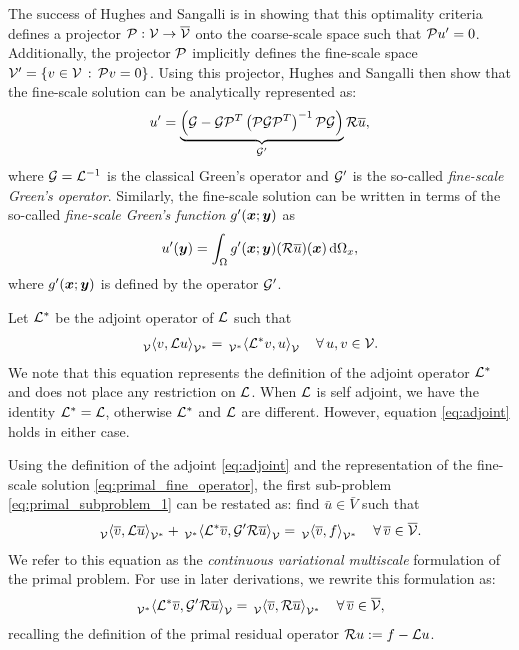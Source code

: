 The success of Hughes and Sangalli
\cite{hughes2007variational} is in showing
that this optimality criteria defines a
projector $\P : \V \to \bar{\V}$ onto the
coarse-scale space such that
$\P u' = 0$. Additionally, the projector $\P$
implicitly defines the fine-scale space
$\V' = \left\{ v \in \V \, : \, \P v = 0 \right\}$.
Using this projector, Hughes and Sangalli
then show that the fine-scale solution can
be analytically represented as:
%
\begin{gather}
u' = \underbrace{
\left(
\G - \G \P^T \left( \P \G \P^T \right) ^{-1} \P \G
\right)
}
_{\G'} \R \bar{u},
\label{eq:primal_fine_operator}
\end{gather}
%
where $\G = \OP^{-1}$ is the classical Green's
operator and $\G'$ is the so-called
\emph{fine-scale Green's operator}. Similarly,
the fine-scale solution can be written
in terms of the so-called
\emph{fine-scale Green's function} $g'(\bs{x};\bs{y})$
as
%
\begin{gather}
u'(\bs{y}) = \int_{\Omega} g'(\bs{x};\bs{y}) (\R \bar{u})(\bs{x})
\, \text{d} \Omega_x,
\label{eq:primal_fine_function}
\end{gather}
%
where $g'(\bs{x};\bs{y})$ is defined by the operator $\G'$.

Let $\OP^*$ be the adjoint operator of $\OP$ such that
%
\begin{gather}
\pairb{v}{\OP u} = \paira{\OP^* v}{u}
\quad \forall \, u, v \in \V.
\label{eq:adjoint}
\end{gather}
%
We note that this equation represents the definition of
the adjoint operator $\OP^*$ and does not place any
restriction on $\OP$. When $\OP$ is self adjoint, we
have the identity $\OP^* = \OP$, otherwise $\OP^*$
and $\OP$ are different. However, equation
\eqref{eq:adjoint} holds in either case.

Using the definition of the adjoint \eqref{eq:adjoint}
and the representation of the
fine-scale solution \eqref{eq:primal_fine_operator},
the first sub-problem \eqref{eq:primal_subproblem_1}
can be restated as:
find $\bar{u} \in \bar{V}$ such that
%
\begin{gather}
\pairb{\bar{v}}{\OP \bar{u}} +
\paira{\OP^* \bar{v}}{\G' \R \bar{u}} =
\pairb{\bar{v}}{f}
\quad \forall \, \bar{v} \in \bar{\V}.
\label{eq:primal_vms}
\end{gather}
%
We refer to this equation as the \emph{continuous
variational multiscale} formulation of the primal
problem. For use in later derivations, we rewrite
this formulation as:
%
\begin{gather}
\paira{\OP^* \bar{v}}{\G' \R \bar{u}} = \pairb{\bar{v}}{\R \bar{u}}
\quad \forall \, \bar{v} \in \bar{\V},
\label{eq:primal_vms_2}
\end{gather}
%
recalling the definition of the primal residual
operator $\R u:= f - \OP u$.


